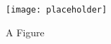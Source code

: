 \lipsum[1]
\begin{figure}[H]
	\centering
	\texttt{[image: placeholder]}
	\caption{A Figure}
\end{figure}